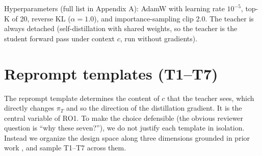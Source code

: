 \documentclass[12pt,a4paper]{report}
\begin{document}
Hyperparameters (full list in Appendix A): AdamW with learning rate \(10^{-5}\), top-K of 20, reverse KL (\(\alpha = 1.0\)), and importance-sampling clip 2.0. The teacher is always detached (self-distillation with shared weights, so the teacher is the student forward pass under context \(c\), run without gradients).

\section{Reprompt templates (T1--T7)}\label{reprompt-templates-t1t7}

The reprompt template determines the content of \(c\) that the teacher sees, which directly changes \(\pi_T\) and so the direction of the distillation gradient. It is the central variable of RO1. To make the choice defensible (the obvious reviewer question is ``why these seven?''), we do not justify each template in isolation. Instead we organize the design space along three dimensions grounded in prior work \cite{r1, r2}, and sample T1--T7 across them.
\end{document}
